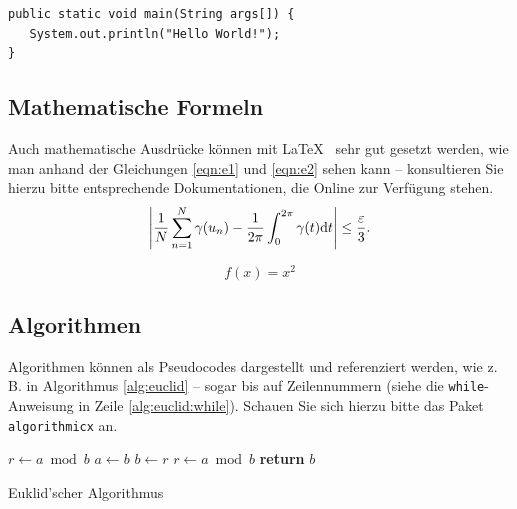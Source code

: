 \lstset{language=Java}
\begin{lstlisting}[caption={Hello World!}, label={lst:helloworld}]
public static void main(String args[]) {
   System.out.println("Hello World!");
}
\end{lstlisting}


\subsection{Mathematische Formeln}
Auch mathematische Ausdrücke können mit \LaTeX~ sehr gut gesetzt werden, wie man anhand der Gleichungen \vref{eqn:e1} und \vref{eqn:e2} sehen kann -- konsultieren Sie hierzu bitte entsprechende Dokumentationen, die Online zur Verfügung stehen.
\begin{equation}
\left|{1\over N}\sum_{n=1}^N \gamma(u_n)-{1\over 2\pi}\int_0^{2\pi}\gamma(t){\rm d}t\right| \le {\varepsilon\over 3}.\\
\label{eqn:e1}
\end{equation}

\begin{equation}
f(x)=x^2
\label{eqn:e2}
\end{equation}


\subsection{Algorithmen}
Algorithmen können als Pseudocodes dargestellt und referenziert werden, wie z.\,B. in Algorithmus \vref{alg:euclid} -- sogar bis auf Zeilennummern
(siehe die \texttt{while}-Anweisung in Zeile \vref{alg:euclid:while}). Schauen Sie sich hierzu bitte das Paket \texttt{algorithmicx} an.



\begin{algorithm}
\begin{algorithmic}[1]
   \State $r\gets a\bmod b$
    \label{alg:euclid:while}
      \State $a\gets b$
      \State $b\gets r$
      \State $r\gets a\bmod b$
   \EndWhile\label{euclidendwhile}
   \State \textbf{return} $b$
\EndProcedure
\end{algorithmic}
\caption{Euklid'scher Algorithmus}\label{alg:euclid}
\end{algorithm}

